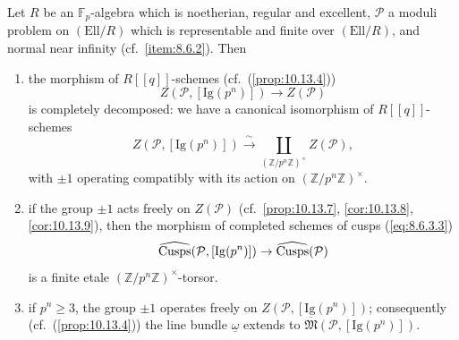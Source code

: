 \begin{kthm}\label{thm:12.7.1}
Let $R$ be an $\mathbb{F}_p$-algebra which is noetherian, regular and excellent, $\mathcal{P}$ a moduli problem on $(\mathrm{Ell}/R)$ which is representable and finite over $(\mathrm{Ell}/R)$, and normal near infinity (cf.~\ref{item:8.6.2}). Then
\begin{enumerate}[label=(\arabic*)]
\item the morphism of $R[[q]]$-schemes (cf.~(\ref{prop:10.13.4}))
\[
Z(\mathcal{P}, [\mathrm{Ig}(p^n)]) \to Z(\mathcal{P})
\]
is completely decomposed: we have a canonical isomorphism of $R[[q]]$-schemes
\[
Z(\mathcal{P}, [\mathrm{Ig}(p^n)]) \xrightarrow{\ \sim\ } \coprod_{(\mathbb{Z}/p^n\mathbb{Z})^\times} Z(\mathcal{P}) ,
\]
with $\pm 1$ operating compatibly with its action on $(\mathbb{Z}/p^n\mathbb{Z})^\times$.
\item if the group $\pm 1$ acts freely on $Z(\mathcal{P})$ (cf.~\ref{prop:10.13.7}, \ref{cor:10.13.8}, \ref{cor:10.13.9}), then the morphism of completed schemes of cusps (\eqref{eq:8.6.3.3})
\[
\widehat{\operatorname{Cusps}}(\mathcal{P}, [\mathrm{Ig}(p^n)]) \to \widehat{\operatorname{Cusps}}(\mathcal{P})
\]
is a finite etale $(\mathbb{Z}/p^n\mathbb{Z})^\times$-torsor.
\item if $p^n \ge 3$, the group $\pm 1$ operates freely on $Z(\mathcal{P}, [\mathrm{Ig}(p^n)])$; consequently (cf.~(\ref{prop:10.13.4})) the line bundle $\underline{\omega}$ extends to $\overline{\mathfrak{M}}(\mathcal{P}, [\mathrm{Ig}(p^n)])$.
\end{enumerate}
\end{kthm}

